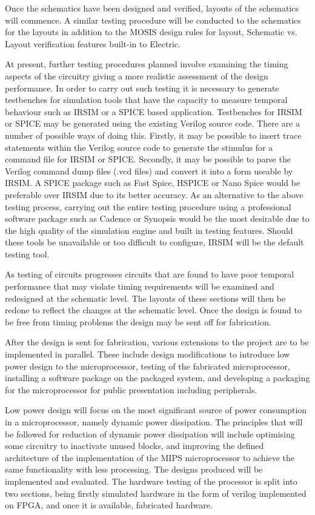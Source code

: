 Once the schematics have been designed and verified, layouts of the schematics will commence. A similar testing procedure will be conducted to the schematics for the layouts in addition to the MOSIS design rules for layout, Schematic vs. Layout verification features built-in to Electric.

At present, further testing procedures planned involve examining the timing aspects of the circuitry giving a more realistic assessment of the design performance. In order to carry out such testing it is necessary to generate testbenches for simulation tools that have the capacity to measure temporal behaviour such as IRSIM or a SPICE based application. Testbenches for IRSIM or SPICE may be generated using the existing Verilog source code. There are a number of possible ways of doing this. Firstly, it may be possible to insert trace statements within the Verilog source code to generate the stimulus for a command file for IRSIM or SPICE. Secondly, it may be possible to parse the Verilog command dump files (.vcd files) and convert it into a form useable by IRSIM. A SPICE package such as Fast Spice, HSPICE or Nano Spice would be preferable over IRSIM due to its better accuracy. As an alternative to the above testing process, carrying out the entire testing procedure using a professional software package such as Cadence or Synopsis would be the most desirable due to the high quality of the simulation engine and built in testing features. Should these tools be unavailable or too difficult to configure, IRSIM will be the default testing tool.

As testing of circuits progresses circuits that are found to have poor temporal performance that may violate timing requirements will be examined and redesigned at the schematic level. The layouts of these sections will then be redone to reflect the changes at the schematic level. Once the design is found to be free from timing problems the design may be sent off for fabrication.

After the design is sent for fabrication, various extensions to the project are to be implemented in parallel. These include design modifications to introduce low power design to the microprocessor, testing of the fabricated microprocessor, installing a software package on the packaged system, and developing a packaging for the microprocessor for public presentation including peripherals.

Low power design will focus on the most significant source of power consumption in a microprocessor, namely dynamic power dissipation. The principles that will be followed for reduction of dynamic power dissipation will include optimising some circuitry to inactivate unused blocks, and improving the defined architecture of the implementation of the MIPS microprocessor to achieve the same functionality with less processing. The designs produced will be implemented and evaluated.
The hardware testing of the processor is split into two sections, being firstly simulated hardware in the form of verilog implemented on FPGA, and once it is available, fabricated hardware.

